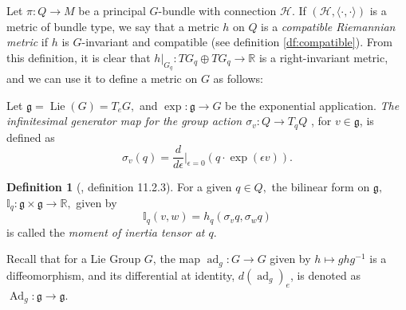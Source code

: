\documentclass[12pt, letterpaper, reqno]{amsart}
\theoremstyle{definition}
\newtheorem{df}{Definition}
\theoremstyle{plain}
\theoremstyle{remark}
\begin{document}
Let $ \pi: Q \rightarrow M $ be a principal $ G $-bundle with connection $ \mathcal{H}. $ If $ (\mathcal{H},\langle\cdot,\cdot\rangle) $ is a metric of bundle type, we say that a metric $ h $ on $ Q $ is a \textit{compatible Riemannian metric} if $ h $ is $ G $-invariant and compatible (see definition \ref{df:compatible}). From this definition, it is clear that $ h|_{G_q}: TG_q \oplus TG_q \rightarrow \mathbb{R} $ is a right-invariant metric, and we can use it to define a metric on $ G $ as follows:

Let $ \mathfrak{g}= \operatorname{Lie}(G)=T_eG, $ and $ \operatorname{exp} : \mathfrak{g}\rightarrow G $ be the exponential application. \textit{The infinitesimal generator map for the group action $ \sigma_v: Q\rightarrow T_qQ $ }, for $ v \in \mathfrak{g} $,  is defined as
$$ \sigma_v(q) = \frac{d}{d\epsilon} \Big|_{\epsilon=0} \left( q\cdot \operatorname{exp} (\epsilon v) \right).$$ 

\begin{df}[\cite{montgomery2002tour}, definition 11.2.3]
	For a given $ q\in Q, $ the bilinear form on $ \mathfrak{g}, $ $ \mathbb{I}_q: \mathfrak{g}\times \mathfrak{g}\rightarrow \mathbb{R}, $ given by
	$$ \mathbb{I}_q(v,w) = h_q(\sigma_v q, \sigma_w q) $$ 
	is called the \textit{moment of inertia tensor at $ q. $ } 
\end{df}

Recall that for a Lie Group $ G $, the map $ \operatorname{ad}_g: G \rightarrow G  $ given by $ h\mapsto ghg^{-1} $ is a diffeomorphism, and its differential at identity, $ d( \operatorname{ad}_g )_e $,  is denoted as $ \operatorname{Ad}_g: \mathfrak{g}\rightarrow \mathfrak{g} $. 
\end{document}
